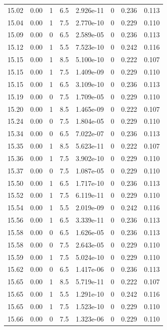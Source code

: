 \documentclass[preview]{standalone}
\begin{document}
{{{{{{{{{{{{{\begin{tabular}{L{1.2cm}C{1.2cm} C{0.3cm}C{0.5cm} C{1.4cm}C{1.4cm} C{1.4cm}C{1.4cm}}
  15.02  &  0.00  & 1     & 6.5 &  2.926e-11  & 0  & 0.236 &  0.113   \\ 
  15.04  &  0.00  & 1     & 7.5 &  2.770e-10  & 0  & 0.229 &  0.110   \\ 
  15.09  &  0.00  & 0     & 6.5 &  2.589e-05  & 0  & 0.236 &  0.113   \\ 
  15.12  &  0.00  & 1     & 5.5 &  7.523e-10  & 0  & 0.242 &  0.116   \\ 
  15.15  &  0.00  & 1     & 8.5 &  5.100e-10  & 0  & 0.222 &  0.107   \\ 
  15.15  &  0.00  & 1     & 7.5 &  1.409e-09  & 0  & 0.229 &  0.110   \\ 
  15.15  &  0.00  & 1     & 6.5 &  3.109e-10  & 0  & 0.236 &  0.113   \\ 
  15.19  &  0.00  & 0     & 7.5 &  1.709e-05  & 0  & 0.229 &  0.110   \\ 
  15.20  &  0.00  & 1     & 8.5 &  1.465e-09  & 0  & 0.222 &  0.107   \\ 
  15.24  &  0.00  & 0     & 7.5 &  1.804e-05  & 0  & 0.229 &  0.110   \\ 
  15.34  &  0.00  & 0     & 6.5 &  7.022e-07  & 0  & 0.236 &  0.113   \\ 
  15.35  &  0.00  & 1     & 8.5 &  5.623e-11  & 0  & 0.222 &  0.107   \\ 
  15.36  &  0.00  & 1     & 7.5 &  3.902e-10  & 0  & 0.229 &  0.110   \\ 
  15.37  &  0.00  & 0     & 7.5 &  1.087e-05  & 0  & 0.229 &  0.110   \\ 
  15.50  &  0.00  & 1     & 6.5 &  1.717e-10  & 0  & 0.236 &  0.113   \\ 
  15.52  &  0.00  & 1     & 7.5 &  6.119e-11  & 0  & 0.229 &  0.110   \\ 
  15.54  &  0.00  & 1     & 5.5 &  2.019e-09  & 0  & 0.242 &  0.116   \\ 
  15.56  &  0.00  & 1     & 6.5 &  3.339e-11  & 0  & 0.236 &  0.113   \\ 
  15.58  &  0.00  & 0     & 6.5 &  1.626e-05  & 0  & 0.236 &  0.113   \\ 
  15.58  &  0.00  & 0     & 7.5 &  2.643e-05  & 0  & 0.229 &  0.110   \\ 
  15.59  &  0.00  & 1     & 7.5 &  5.024e-10  & 0  & 0.229 &  0.110   \\ 
  15.62  &  0.00  & 0     & 6.5 &  1.417e-06  & 0  & 0.236 &  0.113   \\ 
  15.65  &  0.00  & 1     & 8.5 &  5.719e-11  & 0  & 0.222 &  0.107   \\ 
  15.65  &  0.00  & 1     & 5.5 &  1.291e-10  & 0  & 0.242 &  0.116   \\ 
  15.65  &  0.00  & 1     & 7.5 &  1.523e-10  & 0  & 0.229 &  0.110   \\ 
  15.66  &  0.00  & 0     & 7.5 &  1.323e-06  & 0  & 0.229 &  0.110   \\ 
\hline 
\end{tabular} 

}}}}}}}}}}}}}
\end{document}
